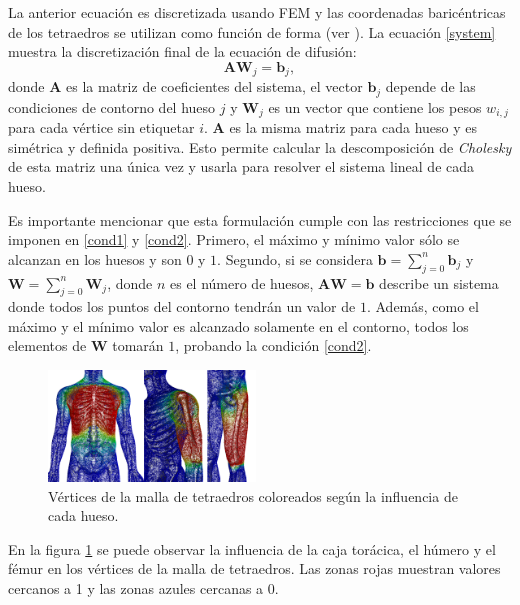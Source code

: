 La anterior ecuación es discretizada usando \ac{FEM} y las coordenadas baricéntricas de los tetraedros se utilizan como función de forma (ver \cite{Lewis2004}). La ecuación \ref{system} muestra la discretización final de la ecuación de difusión:
%
\begin{equation}
\label{system}
\mathbf{A} \mathbf{W}_j = \mathbf{b}_j,
\end{equation}
%
donde $\mathbf{A}$ es la matriz de coeficientes del sistema, el vector $\mathbf{b}_j$ depende de las condiciones de contorno del hueso  $j$ y $\mathbf{W}_j$ es un vector que  contiene los pesos  $w_{i,j}$ para cada vértice sin etiquetar $i$. $\mathbf{A}$ es la misma matriz para cada hueso y es simétrica y definida positiva. Esto permite calcular la descomposición de \emph{Cholesky} de esta matriz una única vez y usarla para resolver el sistema lineal de cada hueso.

Es importante mencionar que esta formulación cumple con las restricciones que se imponen en \ref{cond1} y \ref{cond2}. Primero, el máximo y mínimo valor sólo se alcanzan en los huesos y son $0$ y $1$. Segundo, si se considera $\mathbf{b}=\sum^{n}_{j=0}\mathbf{b}_j $ y $\mathbf{W}=\sum^{n}_{j=0}\mathbf{W}_j $, donde  $n$ es el número de huesos, $\mathbf{A} \mathbf{W} = \mathbf{b}$ describe un sistema donde todos los puntos del contorno tendrán un valor de $1$. Además, como el máximo y el mínimo valor es alcanzado solamente en el contorno, todos los elementos de $\mathbf{W}$ tomarán  $1$, probando la condición \ref{cond2}.

 \begin{figure}[h]
   \centering
\includegraphics[width=0.49\textwidth]{IMG/weights.png}
     \caption{Vértices de la malla de tetraedros coloreados según la influencia de cada hueso.}
      \label{fig:pesado}
\end{figure}
 
En la figura \ref{fig:pesado} se puede observar la influencia de la caja torácica, el húmero y el fémur en los vértices de la malla de tetraedros. Las zonas rojas muestran valores cercanos a 1 y las zonas azules cercanas a 0. 






